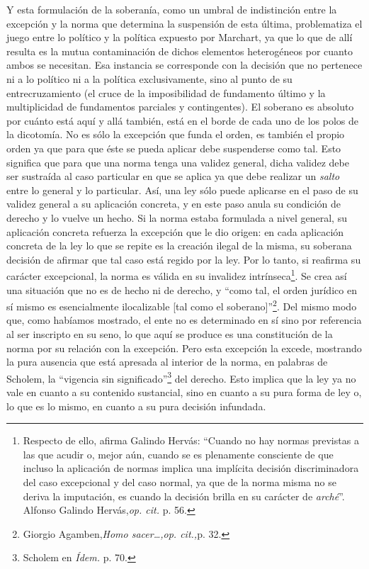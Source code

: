 Y esta formulación de la soberanía, como un umbral de indistinción entre la excepción y la norma que determina la suspensión de esta última, problematiza el juego entre lo político y la política expuesto por Marchart, ya que lo que de allí resulta es la mutua contaminación de dichos elementos heterogéneos por cuanto ambos se necesitan. Esa instancia se corresponde con la decisión que no pertenece ni a lo político ni a la política exclusivamente, sino al punto de su entrecruzamiento (el cruce de la imposibilidad de fundamento último y la multiplicidad de fundamentos parciales y contingentes). El soberano es absoluto por cuánto está aquí y allá también, está en el borde de cada uno de los polos de la dicotomía. No es sólo la excepción que funda el orden, es también el propio orden ya que para que éste se pueda aplicar debe suspenderse como tal. Esto significa que para que una norma tenga una validez general, dicha validez debe ser sustraída al caso particular en que se aplica ya que debe realizar un \emph{salto} entre lo general y lo particular. Así, una ley sólo puede aplicarse en el paso de su validez general a su aplicación concreta, y en este paso anula su condición de derecho y lo vuelve un hecho. Si la norma estaba formulada a nivel general, su aplicación concreta refuerza la excepción que le dio origen: en cada aplicación concreta de la ley lo que se repite es la creación ilegal de la misma, su soberana decisión de afirmar que tal caso está regido por la ley. Por lo tanto, si reafirma su carácter excepcional, la norma es válida en su invalidez intrínseca\footnote{Respecto de ello, afirma Galindo Hervás: \enquote{Cuando no hay normas previstas a las que acudir o, mejor aún, cuando se es plenamente consciente de que incluso la aplicación de normas implica una implícita decisión discriminadora del caso excepcional y del caso normal, ya que de la norma misma no se deriva la imputación, es cuando la decisión brilla en su carácter de \emph{arché}}. Alfonso Galindo Hervás,\emph{op. cit.} p. 56.}. Se crea así una situación que no es de hecho ni de derecho, y \enquote{como tal, el orden jurídico en sí mismo es esencialmente ilocalizable {[}tal como el soberano{]}}\footnote{Giorgio Agamben,\emph{Homo sacer\ldots,op. cit.,}p. 32.}. Del mismo modo que, como habíamos mostrado, el ente no es determinado en sí sino por referencia al ser inscripto en su seno, lo que aquí se produce es una constitución de la norma por su relación con la excepción. Pero esta excepción la excede, mostrando la pura ausencia que está apresada al interior de la norma, en palabras de Scholem, la \enquote{vigencia sin significado}\footnote{Scholem en \emph{Ídem.} p. 70.} del derecho. Esto implica que la ley ya no vale en cuanto a su contenido sustancial, sino en cuanto a su pura forma de ley o, lo que es lo mismo, en cuanto a su pura decisión infundada.

